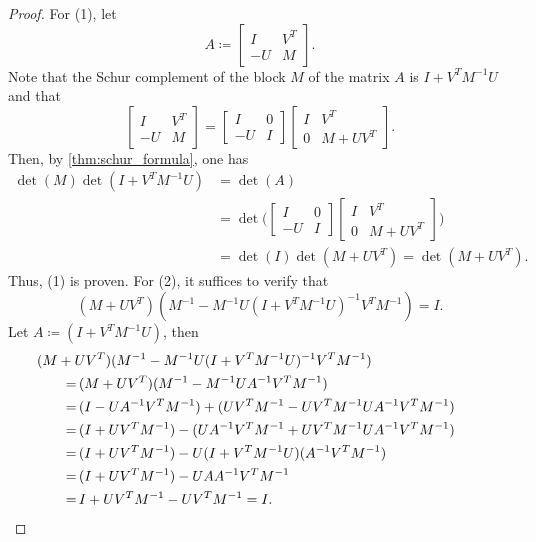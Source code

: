 \begin{proof}
    For (1), let 
    \[
      A \coloneqq \begin{bmatrix} I & V^T \\ -U & M \end{bmatrix}.
    \]
    Note that the Schur complement of the block \(M\) of the matrix \(A\) is \(I + V^TM^{-1}U\) and that 
    \[
      \begin{bmatrix} I & V^T \\ -U & M \end{bmatrix} = 
      \begin{bmatrix} I & 0 \\ -U & I \end{bmatrix} \begin{bmatrix} I & V^T \\ 0 & M + UV^T \end{bmatrix}.
    \]
    Then, by \cref{thm:schur_formula}, one has
    \begin{align*}
      \det(M)\det(I + V^TM^{-1}U) 
      &= \det(A) \\
      &= \det\bigg(\begin{bmatrix} I & 0 \\ -U & I \end{bmatrix} \begin{bmatrix} I & V^T \\ 0 & M + UV^T \end{bmatrix}\bigg) \\
      &= \det(I) \det(M+UV^T) = \det(M+UV^T).
    \end{align*}
    Thus, (1) is proven.
    For (2), it suffices to verify that 
    \[
        (M + UV^T)(M^{-1} - M^{-1}U(I + V^TM^{-1}U)^{-1}V^TM^{-1}) = I.
    \]
    Let \(A \coloneqq (I + V^TM^{-1}U)\), then
    \begin{align*}
        &\!\!\!\!\!\!\!\!\!\!\!\!\!\!\!\!\!\! (M + UV^T)(M^{-1} - M^{-1}U(I + V^TM^{-1}U)^{-1}V^TM^{-1})\\
        = \, &(M + UV^T)(M^{-1} - M^{-1}UA^{-1}V^TM^{-1})\\
        = \, &(I - UA^{-1}V^TM^{-1}) + (UV^TM^{-1} - UV^TM^{-1}UA^{-1}V^TM^{-1}) \\
        = \, &(I + UV^TM^{-1}) - (UA^{-1}V^TM^{-1} + UV^TM^{-1}UA^{-1}V^TM^{-1}) \\
        = \, &(I + UV^TM^{-1}) - U(I + V^TM^{-1}U)(A^{-1}V^TM^{-1}) \\
        = \, &(I + UV^TM^{-1}) - UAA^{-1}V^TM^{-1} \\
        = \, &I + UV^TM^{-1} - UV^TM^{-1} = I. \qedhere \\
    \end{align*}
\end{proof}


